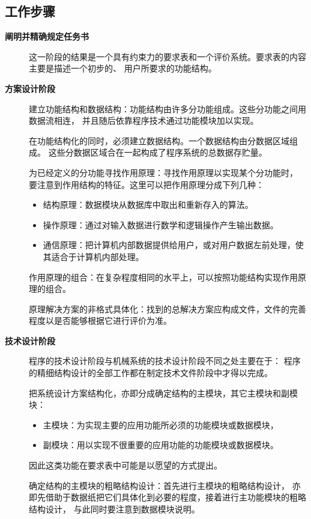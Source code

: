 \documentclass[letterpaper,10pt,english]{sphinxmanual}
\begin{document}
\subsection{工作步骤}
\label{unit10:id17}\begin{description}
\item[{\textbf{阐明并精确规定任务书}}] \leavevmode
这一阶段的结果是一个具有约束力的要求表和一个评价系统。要求表的内容主要是描述一个初步的、
用户所要求的功能结构。

\item[{\textbf{方案设计阶段}}] \leavevmode
建立功能结构和数据结构：功能结构由许多分功能组成。这些分功能之间用数据流相连，
并且随后依靠程序技术通过功能模块加以实现。

在功能结构化的同时，必须建立数据结构。一个数据结构由分数据区域组成。
这些分数据区域合在一起构成了程序系统的总数据存贮量。

为已经定义的分功能寻找作用原理：寻找作用原理以实现某个分功能时，
要注意到作用结构的特征。这里可以把作用原理分成下列几种：
\begin{itemize}
\item {} 
结构原理：数据模块从数据库中取出和重新存入的算法。

\item {} 
操作原理：通过对输入数据进行数学和逻辑操作产生输出数据。

\item {} 
通信原理：把计算机内部数据提供给用户，或对用户数据左前处理，使其适合于计算机内部处理。

\end{itemize}

作用原理的组合：在复杂程度相同的水平上，可以按照功能结构实现作用原理的组合。

原理解决方案的非格式具体化：找到的总解决方案应构成文件，文件的完善程度以是否能够根据它进行评价为准。

\item[{\textbf{技术设计阶段}}] \leavevmode
程序的技术设计阶段与机械系统的技术设计阶段不同之处主要在于：
程序的精细结构设计的全部工作都在制定技术文件阶段中才得以完成。

把系统设计方案结构化，亦即分成确定结构的主模块，其它主模块和副模块：
\begin{itemize}
\item {} 
主模块：为实现主要的应用功能所必须的功能模块或数据模块，

\item {} 
副模块：用以实现不很重要的应用功能的功能模块或数据模块。

\end{itemize}

因此这类功能在要求表中可能是以愿望的方式提出。

确定结构的主模块的粗略结构设计：首先进行主模块的粗略结构设计，
亦即先借助于数据纸把它们具体化到必要的程度，接着进行主功能模块的粗略结构设计，
与此同时要注意到数据模块说明。

\end{description}
\end{document}
